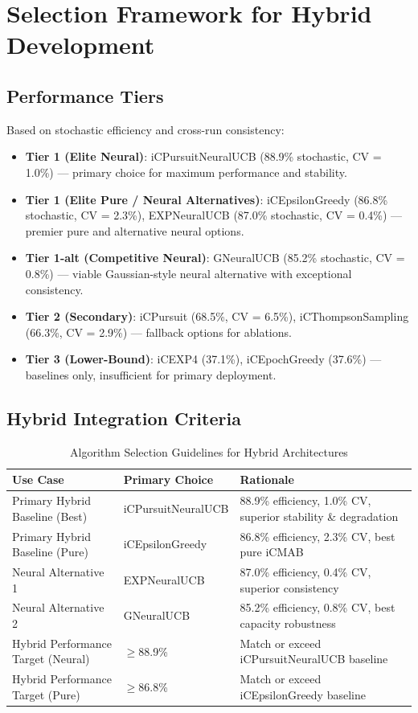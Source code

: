 \documentclass[12pt,a4paper]{article}
\begin{document}
\section{Selection Framework for Hybrid Development}

\subsection{Performance Tiers}

Based on stochastic efficiency and cross-run consistency:

\begin{itemize}
\item \textbf{Tier 1 (Elite Neural)}: iCPursuitNeuralUCB (88.9\% stochastic, CV = 1.0\%) --- primary choice for maximum performance and stability.
\item \textbf{Tier 1 (Elite Pure / Neural Alternatives)}: iCEpsilonGreedy (86.8\% stochastic, CV = 2.3\%), EXPNeuralUCB (87.0\% stochastic, CV = 0.4\%) --- premier pure and alternative neural options.
\item \textbf{Tier 1-alt (Competitive Neural)}: GNeuralUCB (85.2\% stochastic, CV = 0.8\%) --- viable Gaussian-style neural alternative with exceptional consistency.
\item \textbf{Tier 2 (Secondary)}: iCPursuit (68.5\%, CV = 6.5\%), iCThompsonSampling (66.3\%, CV = 2.9\%) --- fallback options for ablations.
\item \textbf{Tier 3 (Lower-Bound)}: iCEXP4 (37.1\%), iCEpochGreedy (37.6\%) --- baselines only, insufficient for primary deployment.
\end{itemize}

\subsection{Hybrid Integration Criteria}

\begin{table}[H]
\footnotesize
\centering
\caption{Algorithm Selection Guidelines for Hybrid Architectures}
\begin{tabular}{@{}lll@{}}\toprule
\textbf{Use Case} & \textbf{Primary Choice} & \textbf{Rationale} \\\midrule
Primary Hybrid Baseline (Best) & iCPursuitNeuralUCB & 88.9\% efficiency, 1.0\% CV, superior stability \& degradation \\
Primary Hybrid Baseline (Pure) & iCEpsilonGreedy & 86.8\% efficiency, 2.3\% CV, best pure iCMAB \\
Neural Alternative 1 & EXPNeuralUCB & 87.0\% efficiency, 0.4\% CV, superior consistency \\
Neural Alternative 2 & GNeuralUCB & 85.2\% efficiency, 0.8\% CV, best capacity robustness \\
Hybrid Performance Target (Neural) & $\geq$88.9\% & Match or exceed iCPursuitNeuralUCB baseline \\
Hybrid Performance Target (Pure) & $\geq$86.8\% & Match or exceed iCEpsilonGreedy baseline \\
\bottomrule
\end{tabular}
\end{table}
\end{document}
